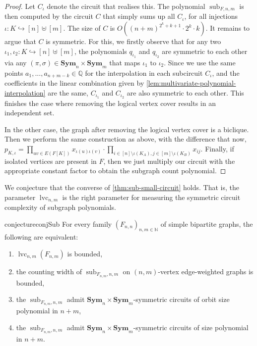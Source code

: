 \documentclass[10pt,a4paper]{article}
\theoremstyle{definition}
\theoremstyle{plain}
\theoremstyle{remark}
\DeclareMathOperator{\sub}{sub}
\DeclareMathOperator{\cc}{lvc}
\newcommand{\Sym}{\mathbf{Sym}}
\newcommand{\bbQ}{\mathbb{Q}}
\begin{document}
\begin{proof}
		Let $C_{\iota}$ denote the circuit that realises this. The polynomial $\sub_{F,n,m}$ is then computed by the circuit $C$ that simply sums up all $C_{\iota}$, for all injections $\iota: K \hookrightarrow [n] \uplus [m]$. The size of $C$ is $O((n+m)^{2^k+k+1} \cdot 2^k \cdot k)$. It remains to argue that $C$ is symmetric. 
		For this, we firstly observe that for any two $\iota_1, \iota_2 \colon K \hookrightarrow [n] \uplus [m]$, the polynomials $q_{\iota_1}$ and $q_{\iota_2}$ are symmetric to each other via any $(\pi, \sigma) \in \Sym_n \times \Sym_m$ that maps $\iota_1$ to $\iota_2$. Since we use the same points $a_1,...,a_{n+m-k} \in \bbQ$ for the interpolation in each subcircuit $C_{\iota}$, and the coefficients in the linear combination given by \cref{lem:multivariate-polynomial-interpolation} are the same, $C_{\iota_1}$ and $C_{\iota_2}$ are also symmetric to each other. This finishes the case where removing the logical vertex cover results in an independent set. 
		
		In the other case, the graph after removing the logical vertex cover is a biclique.
		Then we perform the same construction as above, with the difference that now, $p_{K,\iota} = \prod_{uv \in E(F[K])} x_{\iota(u)\iota(v)} \cdot \prod_{i \in [n] \setminus \iota(K_A), j\in [m] \setminus \iota(K_B)} x_{ij}$.
		Finally, if isolated vertices are present in $F$, then we just multiply our circuit with the appropriate constant factor to obtain the subgraph count polynomial.
	\end{proof}	
	
	We conjecture that the converse of \cref{thm:sub-small-circuit} holds.
	That is, the parameter $\cc_{n,m}$ is the right parameter for measuring the symmetric circuit complexity of subgraph polynomials.
	\begin{restatable}{conjecture}{conjSub}\label{conj:sub}
		For every family $(F_{n,n})_{n,m \in \mathbb{N}}$ of simple bipartite graphs,
		the following are equivalent:
		\begin{enumerate}
			\item $\cc_{n,m}(F_{n,m})$ is bounded,\label{it:subconj1}
			\item the counting width of $\sub_{F_{n,m},n,m}$ on $(n,m)$-vertex edge-weighted graphs is bounded,\label{it:subconj2}
			\item the $\sub_{F_{n,m}, n, m}$ admit $\Sym_n \times \Sym_m$-symmetric circuits of orbit size polynomial in $n+m$,\label{it:subconj3}
			\item the $\sub_{F_{n,m}, n, m}$ admit $\Sym_n \times \Sym_m$-symmetric circuits of size polynomial in $n+m$.\label{it:subconj4}
		\end{enumerate}
	\end{restatable}
	
\end{document}

